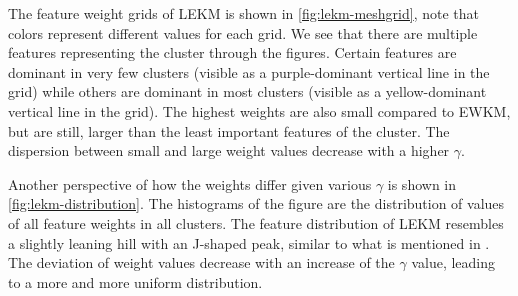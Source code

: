 \documentclass[../report.tex]{subfiles}
\begin{document}
The feature weight grids of LEKM is shown in \cref{fig:lekm-meshgrid}, note that colors represent different values for each grid. We see that there are multiple features representing the cluster through the figures. Certain features are dominant in very few clusters (visible as a purple-dominant vertical line in the grid) while others are dominant in most clusters (visible as a yellow-dominant vertical line in the grid). The highest weights are also small compared to EWKM, but are still, larger than the least important features of the cluster. The dispersion between small and large weight values decrease with a higher $\gamma$.

Another perspective of how the weights differ given various $\gamma$ is shown in \cref{fig:lekm-distribution}. The histograms of the figure are the distribution of values of all feature weights in all clusters. The feature distribution of LEKM resembles a slightly leaning hill with an J-shaped peak, similar to what is mentioned in \cite{Jing2007}. The deviation of weight values decrease with an increase of the $\gamma$ value, leading to a more and more uniform distribution.

\begin{frame}

\begin{figure}
\end{figure}

\end{frame}
\end{document}
